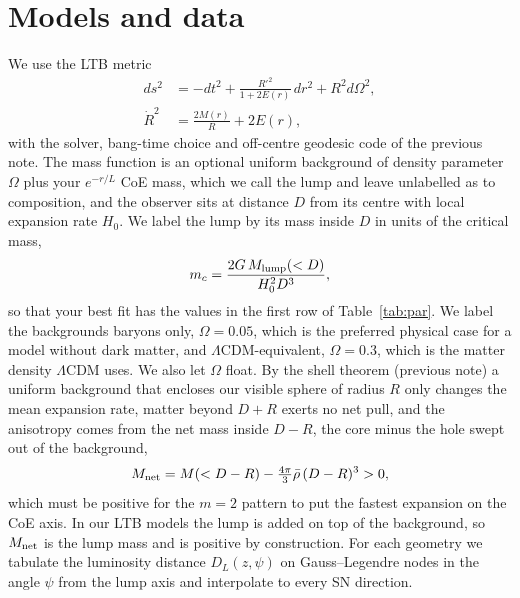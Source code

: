 \documentclass[10pt,twocolumn,letterpaper]{article}
\begin{document}
\section{Models and data}
We use the LTB metric \cite{Bondi1947,Bolejko2011}
\begin{equation}\label{eq:ltb}
\begin{split}ds^2&=-dt^2+\frac{R'^2}{1+2E(r)}\,dr^2+R^2d\Omega^2,\\ \dot R^2&=\frac{2M(r)}{R}+2E(r),\end{split}
\end{equation}
with the solver, bang-time choice and off-centre geodesic code of the previous note. The mass function is an optional uniform background of density parameter $\Omega$ plus your $e^{-r/L}$ CoE mass, which we call the lump and leave unlabelled as to composition, and the observer sits at distance $D$ from its centre with local expansion rate $H_0$. We label the lump by its mass inside $D$ in units of the critical mass,
\begin{equation}\label{eq:mc}
m_c=\frac{2G\,M_{\rm lump}(<D)}{H_0^2D^3},
\end{equation}
so that your best fit has the values in the first row of Table~\ref{tab:par}. We label the backgrounds baryons only, $\Omega=0.05$, which is the preferred physical case for a model without dark matter, and $\Lambda$CDM-equivalent, $\Omega=0.3$, which is the matter density $\Lambda$CDM uses. We also let $\Omega$ float. By the shell theorem (previous note) a uniform background that encloses our visible sphere of radius $R$ only changes the mean expansion rate, matter beyond $D+R$ exerts no net pull, and the anisotropy comes from the net mass inside $D-R$, the core minus the hole swept out of the background,
\begin{equation}\label{eq:mnet}
M_{\rm net}=M(<D-R)-\tfrac{4\pi}{3}\bar\rho\,(D-R)^3>0 ,
\end{equation}
which must be positive for the $m=2$ pattern to put the fastest expansion on the CoE axis. In our LTB models the lump is added on top of the background, so $M_{\rm net}$ is the lump mass and is positive by construction. For each geometry we tabulate the luminosity distance $D_L(z,\psi)$ on Gauss--Legendre nodes in the angle $\psi$ from the lump axis and interpolate to every SN direction.
\end{document}
